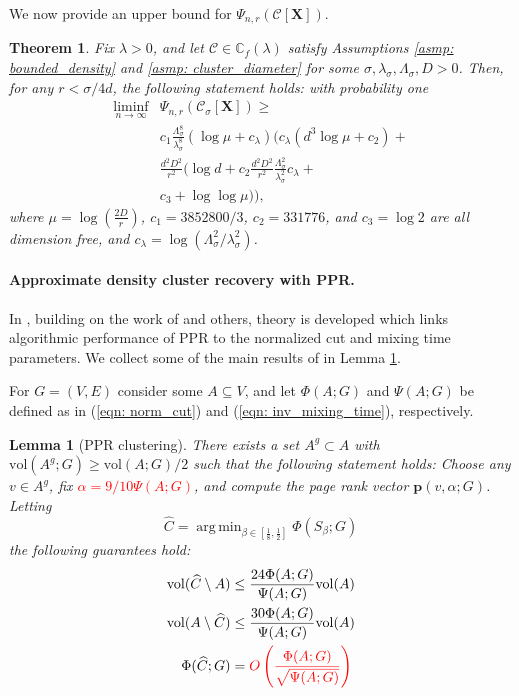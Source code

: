 \documentclass{article}
\newcommand{\vol}{\mathrm{vol}}
\newcommand{\1}{\mathbf{1}}
\newcommand{\pbf}{\mathbf{p}}
\newcommand{\Xbf}{\mathbf{X}}
\newcommand{\Cbb}{\mathbb{C}}
\newcommand{\Cset}{\mathcal{C}}
\newcommand{\Csig}{\Cset_{\sigma}}
\DeclareMathOperator*{\argmin}{arg\,min}
\theoremstyle{aldenthm}
\newtheorem{theorem}{Theorem}
\newtheorem{lemma}{Lemma}
\theoremstyle{remark}
\begin{document}
We now provide an upper bound for $\Psi_{n,r}(\Cset[\Xbf])$.
\begin{theorem}
	\label{thm: inverse_mixing_time_lower_bound}
	Fix $\lambda > 0$, and let $\Cset \in \Cbb_f(\lambda)$ satisfy Assumptions \ref{asmp: bounded_density} and \ref{asmp: cluster_diameter} for some $\sigma, \lambda_{\sigma}, \Lambda_{\sigma}, D > 0$. Then, for any $r < \sigma/4d$, the following statement holds: with probability one
	\begin{align}
	\label{eqn: inverse_mixing_time_lower_bound}
	\liminf_{n \to \infty} & \Psi_{n,r}(\Csig[\Xbf]) \geq \nonumber \\ & c_1 \frac{\Lambda_{\sigma}^8}{\lambda_{\sigma}^8} (\log \mu + c_{\lambda}) \biggl( c_{\lambda}(d^3 \log\mu + c_2) + \nonumber \\
	& \frac{d^2D^2}{r^2} \bigl( \log d + c_2 \frac{d^2D^2}{r^2} \frac{\Lambda_{\sigma}^{2}}{\lambda_{\sigma}^{2}}c_{\lambda} + \nonumber \\
	& c_3  + \log \log \mu \bigr) \biggr),
	\end{align}
	where $\mu = \log(\frac{2D}{r})$, $c_1 = 3852800/3$, $c_2 = 331776$, and $c_3 = \log 2$ are all dimension free, and $c_{\lambda} = \log(\Lambda_{\sigma}^2/ \lambda_{\sigma}^2)$. 
\end{theorem}

\paragraph{Approximate density cluster recovery with PPR.}

In \cite{zhu2013}, building on the work of \cite{anderson2006} and others, theory is developed which links algorithmic performance of PPR to the normalized cut and mixing time parameters. We collect some of the main results of \cite{zhu2013} in Lemma \ref{lem: ppr_cluster}.

For $G = (V,E)$ consider some $A \subseteq V$, and let $\Phi(A; G)$ and $\Psi(A; G)$ be defined as in (\ref{eqn: norm_cut}) and (\ref{eqn: inv_mixing_time}), respectively.
\begin{lemma}[PPR clustering]
	\label{lem: ppr_cluster}
	There exists a set $A^g \subset A$ with $\vol(A^g;G) \geq \vol(A;G)/2$ such that the following statement holds: Choose any $v \in A^g$, fix \textcolor{red}{$\alpha = 9 / 10 \Psi(A; G)$}, and compute the page rank vector $\pbf(v,\alpha; G)$. Letting 
	\begin{equation*}
	\widehat{C} = \argmin_{\beta \in [\frac{1}{8}, \frac{1}{2}]} \Phi(S_{\beta}; G)
	\end{equation*}
	the following guarantees hold:
	\begin{align*}
	\vol(\widehat{C} \setminus A) & \leq \frac{24 \Phi(A; G)}{\Psi(A; G)} \vol(A) \\
	\vol(A \setminus \widehat{C})  & \leq \frac{30 \Phi(A; G)}{\Psi(A; G)} \vol(A) \\
	\Phi(\widehat{C}; G) & = \textcolor{red}{O\left(\frac{\Phi(A; G)}{\sqrt{\Psi(A; G)}}\right)}
	\end{align*}
\end{lemma}
\end{document}
